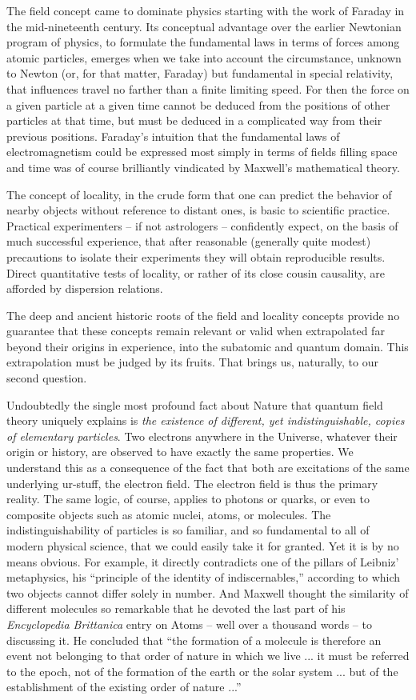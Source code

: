 \documentclass[12pt]{article}
\begin{document}
The field concept came to dominate physics starting with the work of
Faraday in the mid-nineteenth century.  Its conceptual advantage over
the earlier Newtonian program of physics, to formulate the fundamental
laws in terms of forces among atomic particles, emerges when we take
into account the circumstance, unknown to Newton (or, for that matter,
Faraday) but fundamental in special relativity, that influences travel
no farther than a finite limiting speed.  For then the force on a
given particle at a given time cannot be deduced from the positions of
other particles at that time, but must be deduced in a complicated way
from their previous positions.  Faraday's intuition that the
fundamental laws of electromagnetism could be expressed most simply in
terms of fields filling space and time was of course brilliantly
vindicated by Maxwell's mathematical theory.

The concept of locality, in the crude form that one can predict the
behavior of nearby objects without reference to distant ones, is basic
to scientific practice.  Practical experimenters -- if not astrologers
-- confidently expect, on the basis of much successful experience,
that after reasonable (generally quite modest) precautions to isolate
their experiments they will obtain reproducible results.  Direct
quantitative tests of locality, or rather of its close cousin
causality, are afforded by dispersion relations.

The deep and ancient historic roots of the field and locality concepts
provide no guarantee that these concepts remain relevant or valid when
extrapolated far beyond their origins in experience, into the
subatomic and quantum domain.  This extrapolation must be judged by
its fruits.  That brings us, naturally, to our second question.

Undoubtedly the single most profound fact about Nature
that quantum field theory uniquely explains is {\it the existence of
different, yet indistinguishable, copies of elementary particles}.
Two electrons anywhere in the Universe, whatever their origin or
history, are observed to have exactly the same properties.  We
understand this as a consequence of the fact that both are excitations
of the same underlying ur-stuff, the electron field.  The electron
field is thus the primary reality.  The same logic, of course, applies
to photons or quarks, or even to composite objects such as atomic
nuclei, atoms, or molecules.  The indistinguishability of particles is
so familiar, and so fundamental to all of modern physical science,
that we could easily take it for granted.  Yet it is by no means
obvious.  For example, it directly contradicts one of the pillars of
Leibniz' metaphysics, his ``principle of the identity of
indiscernables,'' according to which two objects cannot differ
solely in number.  And Maxwell thought the similarity of different
molecules so remarkable that he devoted the last part of his {\it
Encyclopedia Brittanica\/} entry on Atoms -- well over a thousand
words -- to discussing it.  He concluded that ``the formation of a
molecule is therefore an event not belonging to that order of nature
in which we live ... it must be referred to the epoch, not of the
formation of the earth or the solar system ... but of the
establishment of the existing order of nature ...'' 
\end{document}
